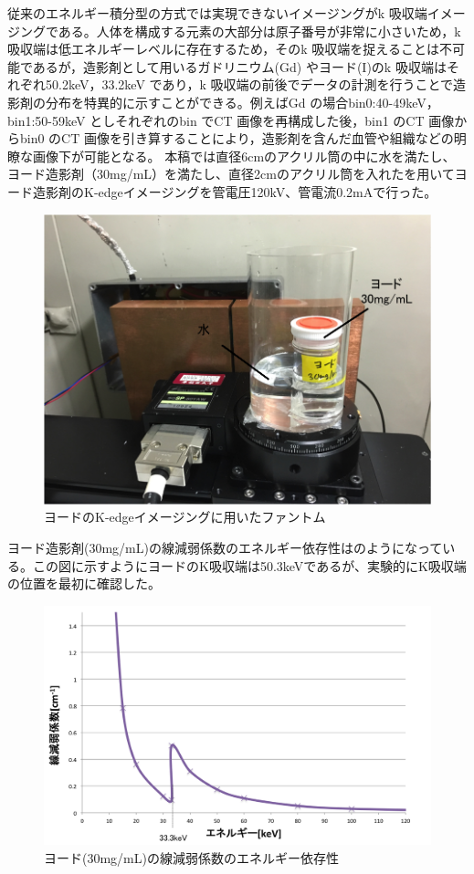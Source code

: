 従来のエネルギー積分型の方式では実現できないイメージングがk 吸収端イメージングである。人体を構成する元素の大部分は原子番号が非常に小さいため，k 吸収端は低エネルギーレベルに存在するため，そのk 吸収端を捉えることは不可能であるが，造影剤として用いるガドリニウム(Gd) やヨード(I)のk 吸収端はそれぞれ50.2keV，33.2keV であり，k 吸収端の前後でデータの計測を行うことで造影剤の分布を特異的に示すことができる。例えばGd の場合bin0:40-49keV，bin1:50-59keV としそれぞれのbin でCT 画像を再構成した後，bin1 のCT 画像からbin0 のCT 画像を引き算することにより，造影剤を含んだ血管や組織などの明瞭な画像下が可能となる。
本稿では直径6cmのアクリル筒の中に水を満たし、ヨード造影剤（30mg/mL）を満たし、直径2cmのアクリル筒を入れたを用いてヨード造影剤のK-edgeイメージングを管電圧120kV、管電流0.2mAで行った。

\begin{figure}[H]
 \begin{center}
 \includegraphics[bb=0.000000 0.000000 419.965283 315.333932,width=0.6\hsize]{image2/chapter5/Iodine_phantom.png} 
 \end{center}
 \caption{ヨードのK-edgeイメージングに用いたファントム}
 \label{fig:Iodine_phantom}
\end{figure}

ヨード造影剤(30mg/mL)の線減弱係数のエネルギー依存性はのようになっている。この図に示すようにヨードのK吸収端は50.3keVであるが、実験的にK吸収端の位置を最初に確認した。


\begin{figure}[H]
 \begin{center}
 \includegraphics[bb=0.000000 0.000000 641.226992 396.927187,width=0.8\hsize]{image2/chapter5/iodine_atten.png} 
 \end{center}
 \caption{ヨード(30mg/mL)の線減弱係数のエネルギー依存性}
 \label{fig:iodine_atten}
\end{figure}


